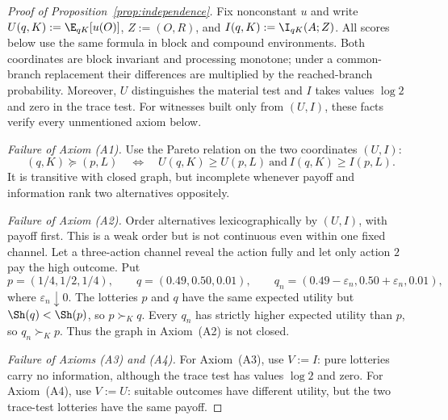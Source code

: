 \begin{proof}[Proof of Proposition~\ref{prop:independence}]
Fix nonconstant $u$ and write $U(q,K):=\E_{qK}[u(O)]$, $Z:=(O,R)$, and
$I(q,K):=\I_{qK}(A;Z)$.  All scores below use the same formula in block and
compound environments.  Both coordinates are block invariant and processing
monotone; under a common-branch replacement their differences are multiplied
by the reached-branch probability.  Moreover, $U$ distinguishes the material
test and $I$ takes values $\log2$ and zero in the trace test.  For witnesses
built only from $(U,I)$, these facts verify every unmentioned axiom below.

\emph{Failure of Axiom \textup{(A1)}.}
Use the Pareto relation on the two coordinates $(U,I)$:
\[
 (q,K)\succeq(p,L)
 \quad\Longleftrightarrow\quad
 U(q,K)\ge U(p,L)\ \text{and}\ I(q,K)\ge I(p,L).
\]
It is transitive with closed graph, but incomplete whenever payoff and
information rank two alternatives oppositely.

\emph{Failure of Axiom \textup{(A2)}.}
Order alternatives lexicographically by $(U,I)$, with payoff first.  This is
a weak order but is not continuous even within one fixed channel.  Let a
three-action channel reveal the action fully and let only action $2$ pay the high outcome.  Put
\[
 p=(1/4,1/2,1/4),\qquad q=(0.49,0.50,0.01),\qquad
 q_n=(0.49-\varepsilon_n,0.50+\varepsilon_n,0.01),
\]
where $\varepsilon_n\downarrow0$.  The lotteries $p$ and $q$ have the same expected utility but
$\Sh(q)<\Sh(p)$, so $p\succ_Kq$.  Every $q_n$ has strictly higher expected utility than $p$, so
$q_n\succ_Kp$.  Thus the graph in Axiom~\textup{(A2)} is not closed.

\emph{Failure of Axioms \textup{(A3)} and \textup{(A4)}.}
For Axiom~\textup{(A3)}, use $V:=I$: pure lotteries carry no information,
although the trace test has values $\log2$ and zero.  For
Axiom~\textup{(A4)}, use $V:=U$: suitable outcomes have different utility,
but the two trace-test lotteries have the same payoff.


\end{proof}
